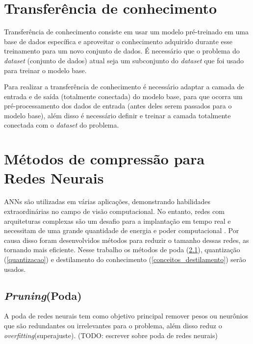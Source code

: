 
\section{Transferência de conhecimento}\label{conceitos_transferencia}
Transferência de conhecimento consiste em usar um modelo pré-treinado em uma base de dados específica e aproveitar
o conhecimento adquirido durante esse treinamento para um novo conjunto de dados.
É necessário que o problema do \textit{dataset} (conjunto de dados) atual seja um subconjunto do \textit{dataset}
que foi usado para treinar o modelo base.

Para realizar a transferência de conhecimento é necessário adaptar a camada de entrada e de saída
(totalmente conectada) do modelo base, para que ocorra um pré-processamento dos dados de entrada
(antes deles serem passados para o modelo base), além disso é necessário definir e treinar a camada totalmente
conectada com o \textit{dataset} do problema.

\section{Métodos de compressão para Redes Neurais}
ANNs são utilizadas em várias aplicações, demonstrando habilidades extraordinárias no campo de visão computacional.
No entanto, redes com arquiteturas complexas são um desafio para a implantação em tempo real e necessitam de uma
grande quantidade de energia e poder computacional \cite{LIANG2021370}.
Por causa disso foram desenvolvidos métodos para reduzir o tamanho dessas redes, as tornando mais eficiente.
Nesse trabalho os métodos de poda (\ref{poda}), quantização (\ref{quantizacao}) e destilamento do conhecimento
(\ref{conceitos_destilamento}) serão usados.

\subsection{\textit{Pruning}(Poda)}\label{poda}
A poda de redes neurais tem como objetivo principal remover pesos ou neurônios que são
redundantes ou irrelevantes para o problema, além disso reduz o \textit{overfitting}(superajuste).
(TODO: escrever sobre poda de redes neurais)


